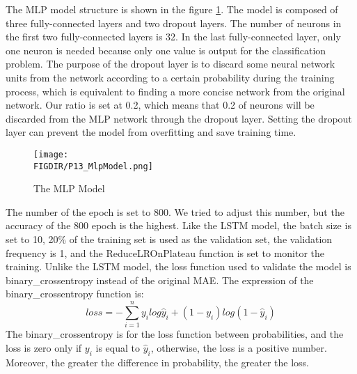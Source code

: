 The MLP model structure is shown in the figure \ref{MLP structure}. The model is composed of three fully-connected layers and two dropout layers. The number of neurons in the first two fully-connected layers is 32. In the last fully-connected layer, only one neuron is needed because only one value is output for the classification problem. The purpose of the dropout layer is to discard some neural network units from the network according to a certain probability during the training process, which is equivalent to finding a more concise network from the original network. Our ratio is set at 0.2, which means that 0.2 of neurons will be discarded from the MLP network through the dropout layer. Setting the dropout layer can prevent the model from overfitting and save training time.

\begin{figure}[ht]
\centering
\texttt{[image: \\FIGDIR/P13\_MlpModel.png]}
\caption{The MLP Model}
\label{MLP structure}
\end{figure}
The number of the epoch is set to 800. We tried to adjust this number, but the accuracy of the 800 epoch is the highest. Like the LSTM model, the batch size is set to 10, 20\% of the training set is used as the validation set, the validation frequency is 1, and the ReduceLROnPlateau function is set to monitor the training. Unlike the LSTM model, the loss function used to validate the model is binary\_crossentropy instead of the original MAE.  The expression of the binary\_crossentropy function is:
\begin{equation}
    loss = - \sum_{i=1}^n y_i log \hat{y}_i + (1 - y_i ) log(1 - \hat{y}_i)
\end{equation}
The binary\_crossentropy is for the loss function between probabilities, and the loss is zero only if $y_i$ is equal to $\hat{y}_i$, otherwise, the loss is a positive number. Moreover, the greater the difference in probability, the greater the loss. 
